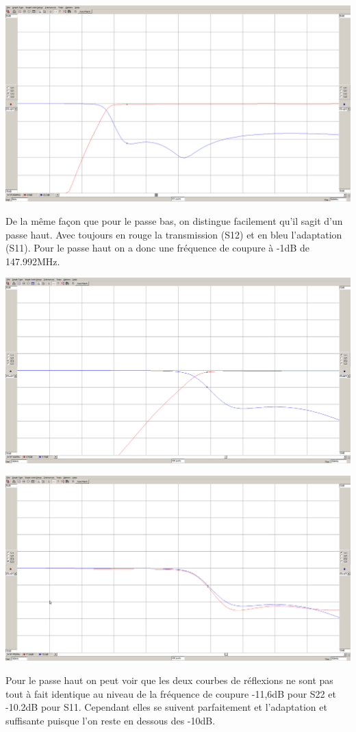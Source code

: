 \documentclass[a4paper,12pt]{report}            %
\begin{document}
\begin{center}\includegraphics[scale = 0.25]{pic/parametre_passe_haut.png}\\ \end{center}
De la même façon que pour le passe bas, on distingue facilement qu'il sagit d'un passe haut.
Avec toujours en rouge la transmission (S12) et en bleu l'adaptation (S11). Pour le passe haut 
on a donc une fréquence de coupure à -1dB de 147.992MHz.
\begin{center}\includegraphics[scale = 0.25]{pic/freq_coupure_ph.png}\\ \end{center}

\begin{center}\includegraphics[scale = 0.25]{pic/reflexion_ph.png}\\ \end{center}
Pour le passe haut on peut voir que les deux courbes de réflexions ne sont pas tout à fait 
identique au niveau de la fréquence de coupure -11,6dB pour S22 et -10.2dB pour S11. Cependant 
elles se suivent parfaitement et l'adaptation et suffisante puisque l'on reste en dessous des -10dB.
\end{document}
